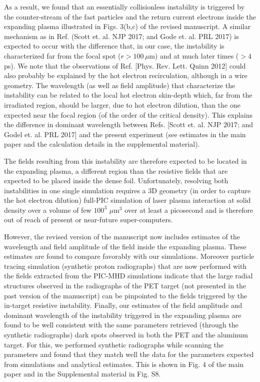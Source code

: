 \documentclass{article}
\begin{document}
\begin{enumerate}
As a result, we found that an essentially collisionless instability  is triggered by the counter-stream of the fast particles and the return current electrons  inside the expanding plasma illustrated in Figs. 3(b,c) of the revised manuscript.
A similar mechanism as in Ref. (Scott et. al. NJP 2017; and Gode et. al. PRL 2017)   is expected to occur with the difference that, in our case,  the instability is characterized far from the focal spot ($r > 100 \, \mu$m) and at much later times ($>4$ ps).
We note that the observations of Ref. [Phys. Rev. Lett. Quinn 2012] could also probably be explained by the hot electron recirculation, although  in a wire geometry.
The wavelength (as well as field amplitude) that characterize the instability can be related to the local hot electron skin-depth which,  far from the irradiated region, should be larger, due to hot electron dilution, than the one expected near the focal region (of the order of the critical density). This explains the difference in dominant wavelength between Refs. [Scott et. al. NJP 2017; and Godel et. al. PRL 2017]  and the present experiment (see estimates in the main paper and the calculation details in the supplemental material).

The fields resulting from this instability  are therefore expected to be located in the expanding plasma, a different region than the resistive fields that are expected to be placed inside the dense foil.
Unfortunately, resolving both instabilities in one single simulation requires a  3D geometry (in order to capture the hot electron dilution) full-PIC simulation of laser plasma interaction at solid density over a volume of  few   $100^3$ $\mu$m$^3$   over at least a picosecond and is therefore out of reach of present or near-future super-computers.

However, the revised version of the manuscript now includes estimates of the wavelength and field amplitude of the field inside the expanding plasma. These estimates are found to compare favorably with our simulations.  Moreover particle tracing simulation (synthetic proton radiographs) that are now performed with the fields extracted from the PIC-MHD simulations indicate that the large radial structures observed in the radiographs of the PET target (not presented in the past version of the manuscript) can be pinpointed to the fields triggered by the in-target resistive instability.
Finally, our estimates of the field amplitude and dominant wavelength of the instability triggered in the expanding plasma are found to be well consistent with the same parameters retrieved (through the synthetic radiographs) dark spots observed in both the PET and the aluminum target. For this, we performed synthetic radiographs while scanning the parameters and found that they match well the data for the parameters expected from simulations and analytical estimates. This is shown in Fig. 4  of the main paper  and in the Supplemental material in Fig. S8.



\end{enumerate}
\end{document}

